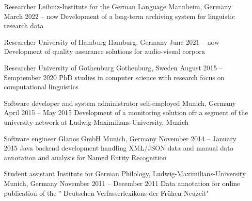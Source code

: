 \documentclass[11pt, a4]{academic-cv}
\begin{document}
\begin{cventries}
\cventry
{Researcher} %
{ Leibniz-Institute for the German Language} %
{Mannheim, Germany} %
{March 2022 -- now} %
{
Development of a long-term archiving system for linguistic research data
}

\cventry
{Researcher} %
{ University of Hamburg} %
{Hamburg, Germany} %
{June 2021 -- now} %
{
Development of quality assurance solutions for audio-visual corpora
}

\cventry
{Researcher} %
{ University of Gothenburg} %
{Gothenburg, Sweden} %
{August 2015 -- Semptember 2020} %
{
PhD studies in computer science with research focus on computational linguistics
}

\cventry
{Software developer and system administrator} %
{self-employed} %
{Munich, Germany} %
{April 2015 -- May 2015} %
{
Development of a monitoring solution ofr a segment of the university network at Ludwig-Maximilians-University, Munich
}

\cventry
{Software engineer} %
{ Glanos GmbH} %
{Munich, Germany} %
{November 2014 -- January 2015} %
{
Java backend development handling XML/JSON data and manual data annotation and analysis for Named Entity Recognition
}

\cventry
{Student assistant} %
{ Institute for German Philology, Ludwig-Maximilians-University} %
{Munich, Germany} %
{November 2011 -- December 2011} %
{
Data annotation for online publication of the " Deutschen Verfasserlexikons der Frühen Neuzeit"
}


\end{cventries}
\end{document}
